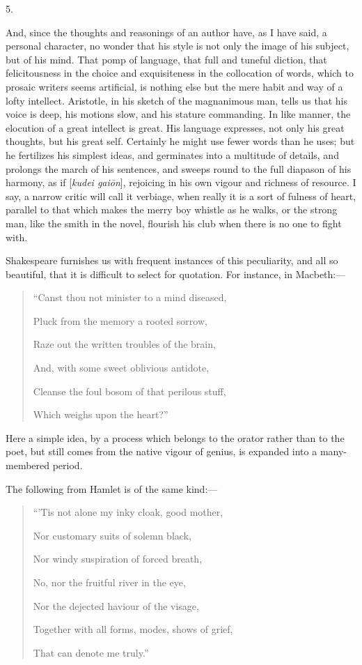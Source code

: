 5.

And, since the thoughts and reasonings of an author have, as I have
said, a personal character, no wonder that his style is not only
the image of his subject, but of his mind. That pomp of language, that
full and tuneful diction, that felicitousness in the choice and
exquisiteness in the collocation of words, which to prosaic writers
seems artificial, is nothing else but the mere habit and way of a
lofty intellect. Aristotle, in his sketch of the magnanimous man,
tells us that his voice is deep, his motions slow, and his stature
commanding. In like manner, the elocution of a great intellect is
great. His language expresses, not only his great thoughts, but his
great self. Certainly he might use fewer words than he uses; but he
fertilizes his simplest ideas, and germinates into a multitude of
details, and prolongs the march of his sentences, and sweeps round to
the full diapason of his harmony, as if [\emph{kudei gai\={o}n}],
rejoicing in his own vigour and richness of resource. I say, a narrow
critic will call it verbiage, when really it is a sort of fulness of
heart, parallel to that which makes the merry boy whistle as he walks,
or the strong man, like the smith in the novel, flourish his club when
there is no one to fight with.

Shakespeare furnishes us with frequent instances of this
peculiarity, and all so beautiful, that it is difficult to select for
quotation. For instance, in Macbeth:—

\begin{quote}

``Canst thou not minister to a mind diseased,

Pluck from the memory a rooted sorrow,

Raze out the written troubles of the brain,

And, with some sweet oblivious antidote,

Cleanse the foul bosom of that perilous stuff,

Which weighs upon the heart?''

\end{quote}

Here a simple idea, by a process which belongs to the orator rather
than to the poet, but still comes from the native vigour of genius, is
expanded into a many-membered period.

The following from Hamlet is of the same kind:—

\begin{quote}

``'Tis not alone my inky cloak, good mother,

Nor customary suits of solemn black,

Nor windy suspiration of forced breath,

No, nor the fruitful river in the eye,

Nor the dejected haviour of the visage,

Together with all forms, modes, shows of grief,

That can denote me truly.''

\end{quote}

